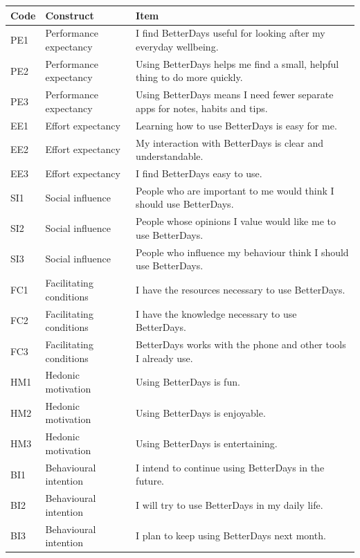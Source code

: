 \documentclass{article}
\begin{document}
\begin{center}
\small
\begin{tabularx}{\linewidth}{|L{1.0cm}|L{4.0cm}|Y|}
\hline
\textbf{Code} & \textbf{Construct} & \textbf{Item} \\ \hline
PE1 & Performance expectancy & I find BetterDays useful for looking after my everyday wellbeing. \\ \hline
PE2 & Performance expectancy & Using BetterDays helps me find a small, helpful thing to do more quickly. \\ \hline
PE3 & Performance expectancy & Using BetterDays means I need fewer separate apps for notes, habits and tips. \\ \hline
EE1 & Effort expectancy & Learning how to use BetterDays is easy for me. \\ \hline
EE2 & Effort expectancy & My interaction with BetterDays is clear and understandable. \\ \hline
EE3 & Effort expectancy & I find BetterDays easy to use. \\ \hline
SI1 & Social influence & People who are important to me would think I should use BetterDays. \\ \hline
SI2 & Social influence & People whose opinions I value would like me to use BetterDays. \\ \hline
SI3 & Social influence & People who influence my behaviour think I should use BetterDays. \\ \hline
FC1 & Facilitating conditions & I have the resources necessary to use BetterDays. \\ \hline
FC2 & Facilitating conditions & I have the knowledge necessary to use BetterDays. \\ \hline
FC3 & Facilitating conditions & BetterDays works with the phone and other tools I already use. \\ \hline
HM1 & Hedonic motivation & Using BetterDays is fun. \\ \hline
HM2 & Hedonic motivation & Using BetterDays is enjoyable. \\ \hline
HM3 & Hedonic motivation & Using BetterDays is entertaining. \\ \hline
BI1 & Behavioural intention & I intend to continue using BetterDays in the future. \\ \hline
BI2 & Behavioural intention & I will try to use BetterDays in my daily life. \\ \hline
BI3 & Behavioural intention & I plan to keep using BetterDays next month. \\ \hline
\end{tabularx}
\end{center}
\end{document}
